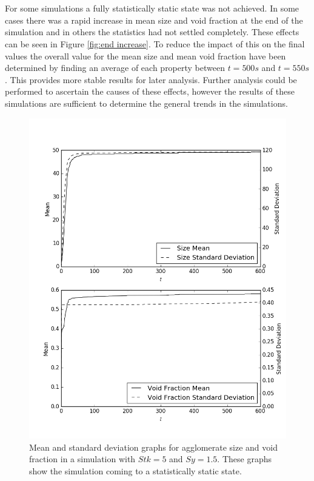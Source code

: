 \documentclass[a4paper,11pt,titlepage]{report}
\begin{document}
\\\\For some simulations a fully statistically static state was not achieved. In some cases there was a rapid increase in mean size and void fraction at the end of the simulation and in others the statistics had not settled completely. These effects can be seen in Figure \ref{fig:end increase}. To reduce the impact of this on the final values the overall value for the mean size and mean void fraction have been determined by finding an average of each property between $t = 500s$ and $t = 550s$. This provides more stable results for later analysis. Further analysis could be performed to ascertain the causes of these effects, however the results of these simulations are sufficient to determine the general trends in the simulations.
\begin{figure}[!htb]
\centering
\includegraphics[scale=0.6]{figures/analysis/statistically_static.png}
\caption{Mean and standard deviation graphs for agglomerate size and void fraction in a simulation with $Stk = 5$ and $Sy = 1.5$. These graphs show the simulation coming to a statistically static state.}
\label{fig:statistically static}
\end{figure}
\end{document}

